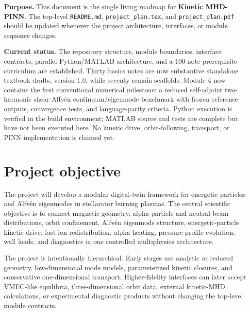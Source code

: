 \documentclass[11pt]{article}
\begin{document}

\begin{keybox}
\textbf{Purpose.} This document is the single living roadmap for \textbf{Kinetic MHD-PINN}. The top-level \texttt{README.md}, \texttt{project\_plan.tex}, and \texttt{project\_plan.pdf} should be updated whenever the project architecture, interfaces, or module sequence changes.
\end{keybox}

\ProjectTOC

\begin{notebox}
\textbf{Current status.} The repository structure, module boundaries, interface contracts, parallel Python/MATLAB architecture, and a 100-note prerequisite curriculum are established. Thirty basics notes are now substantive standalone textbook drafts, version 1.0, while seventy remain scaffolds. Module 4 now contains the first conventional numerical milestone: a reduced self-adjoint two-harmonic shear-Alfv\'en continuum/eigenmode benchmark with frozen reference outputs, convergence tests, and language-parity criteria. Python execution is verified in the build environment; MATLAB source and tests are complete but have not been executed here. No kinetic drive, orbit-following, transport, or PINN implementation is claimed yet.
\end{notebox}

\section{Project objective}
The project will develop a modular digital-twin framework for energetic particles and Alfv\'en eigenmodes in stellarator burning plasmas. The central scientific objective is to connect magnetic geometry, alpha-particle and neutral-beam distributions, orbit confinement, Alfv\'en eigenmode structure, energetic-particle kinetic drive, fast-ion redistribution, alpha heating, pressure-profile evolution, wall loads, and diagnostics in one controlled multiphysics architecture.

The project is intentionally hierarchical. Early stages use analytic or reduced geometry, low-dimensional mode models, parameterized kinetic closures, and conservative one-dimensional transport. Higher-fidelity interfaces can later accept VMEC-like equilibria, three-dimensional orbit data, external kinetic-MHD calculations, or experimental diagnostic products without changing the top-level module contracts.
\end{document}
